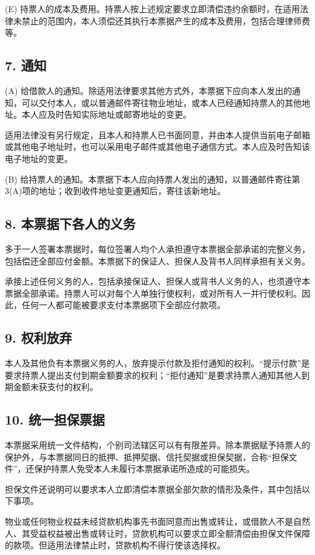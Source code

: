 \documentclass[UTF8,fontset=none,11pt,a4paper]{ctexart}
\begin{document}
(E) 持票人的成本及费用。持票人按上述规定要求立即清偿违约余额时，在适用法律未禁止的范围内，本人须偿还其执行本票据产生的成本及费用，包括合理律师费等。


\subsection*{7. 通知}
(A) 给借款人的通知。除适用法律要求其他方式外，本票据下应向本人发出的通知，可以交付本人，或以普通邮件寄往物业地址，或本人已经通知持票人的其他地址。本人应及时告知实际地址或邮寄地址的变更。


适用法律没有另行规定，且本人和持票人已书面同意，并由本人提供当前电子邮箱或其他电子地址时，也可以采用电子邮件或其他电子通信方式。本人应及时告知该电子地址的变更。


(B) 给持票人的通知。本票据下本人应向持票人发出的通知，以普通邮件寄往第3(A)项的地址；收到收件地址变更通知后，寄往该新地址。


\subsection*{8. 本票据下各人的义务}
多于一人签署本票据时，每位签署人均个人承担遵守本票据全部承诺的完整义务，包括偿还全部应付金额。本票据下的保证人、担保人及背书人同样承担有关义务。


承接上述任何义务的人，包括承接保证人、担保人或背书人义务的人，也须遵守本票据全部承诺。持票人可以对每个人单独行使权利，或对所有人一并行使权利。因此，任何一人都可能被要求支付本票据项下全部应付款项。


\subsection*{9. 权利放弃}
本人及其他负有本票据义务的人，放弃提示付款及拒付通知的权利。“提示付款”是要求持票人提出支付到期金额要求的权利；“拒付通知”是要求持票人通知其他人到期金额未获支付的权利。


\subsection*{10. 统一担保票据}
本票据采用统一文件结构，个别司法辖区可以有有限差异。除本票据赋予持票人的保护外，与本票据同日的抵押、抵押契据、信托契据或担保契据，合称“担保文件”，还保护持票人免受本人未履行本票据承诺所造成的可能损失。


担保文件还说明可以要求本人立即清偿本票据全部欠款的情形及条件，其中包括以下事项。


物业或任何物业权益未经贷款机构事先书面同意而出售或转让，或借款人不是自然人、其受益权益被出售或转让时，贷款机构可以要求立即全额清偿由担保文件保障的款项。但适用法律禁止时，贷款机构不得行使该选择权。
\end{document}
